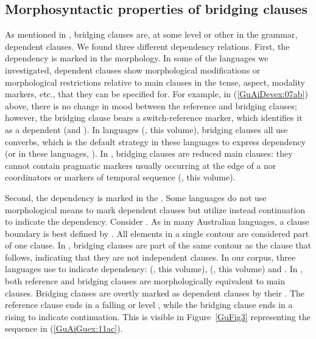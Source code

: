 \documentclass[output=paper]{LSP/langsci}
\begin{document}
\subsection{Morphosyntactic properties of bridging clauses}
\label{GuAi2.3Morphosy.brid.cl}
As mentioned in , bridging clauses are, at some level or other in the grammar, dependent clauses. We found three different dependency relations. First, the dependency is marked in the morphology. In some of the languages we investigated, dependent clauses show morphological modifications or morphological restrictions relative to main clauses in the tense, aspect, modality markers, etc., that they can be specified for. For example, in (\ref{GuAiDevex:07ab}) above, there is no change in mood between the reference and bridging clauses; however, the bridging clause bears a switch-reference marker, which identifies it as a dependent (and ). In  languages (\citeauthor{anker18}, this volume), bridging clauses all use converbs, which is the default strategy in these languages to express dependency (or in these languages, ). In , bridging clauses are reduced main clauses: they cannot contain pragmatic markers usually occurring at the edge of a  nor coordinators or markers of temporal sequence (\citeauthor{jarkey18}, this volume). 

Second, the dependency is marked in the . Some languages do not use morphological means to mark dependent clauses but utilize instead continuation  to indicate the dependency. Consider  \citep[][5, 10]{McKay.2008}. As in many Australian languages, a clause boundary is best defined by . All elements in a single  contour are considered part of one clause. In , bridging clauses are part of the same  contour as the clause that follows, indicating that they are not independent clauses. In our corpus, three languages use  to indicate dependency:  (\citeauthor{guerinchap18}, this volume),  (\citeauthor{sarvasy18}, this volume) and  \citep{Pensalfini}. In , both reference and bridging clauses are morphologically equivalent to main clauses. Bridging clauses are overtly marked as dependent clauses by their . The reference clause ends in a falling or level , while the bridging clause ends in a rising  to indicate continuation. This is visible in Figure~\ref{GuFig3} representing the sequence in (\ref{GuAiGuex:11ac}). 
\end{document}
